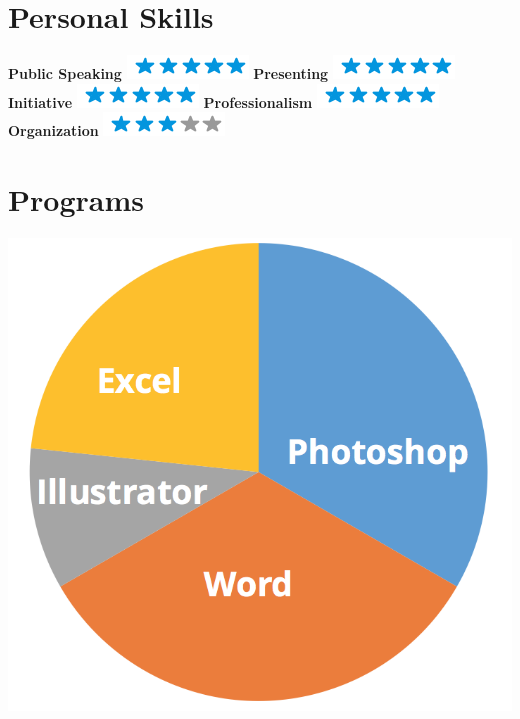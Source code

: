 \documentclass[]{friggeri-cv}
\begin{document}
\begin{aside}
  \section{Personal Skills}
    \textbf{Public Speaking}
    \includegraphics[scale=0.40]{img/5stars.png}
    \textbf{Presenting}
    \includegraphics[scale=0.40]{img/5stars.png}
    \textbf{Initiative}
    \includegraphics[scale=0.40]{img/5stars.png}
    \textbf{Professionalism}
    \includegraphics[scale=0.40]{img/5stars.png}
    \textbf{Organization}
    \includegraphics[scale=0.40]{img/3stars.png}    
    ~
  \section{Programs}
    \includegraphics[scale=0.30]{img/programs.png}
    ~
\end{aside}
\end{document}
